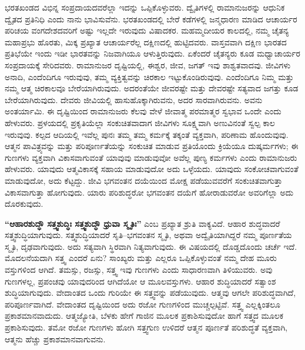 ಭರತಖಂಡದ ವಿಭಿನ್ನ ಸಂಪ್ರದಾಯದವರೆಲ್ಲಾ ಇದನ್ನು ಒಪ್ಪಿಕೊಳ್ಳುವರು. ದ್ವೈತಿಗಳಲ್ಲಿ ರಾಮಾನುಜರನ್ನು ಆಧುನಿಕ ದ್ವೈತದ ಪ್ರತಿನಿಧಿ ಎಂದು ನಾನು ಭಾವಿಸುವೆನು. ಭರತಖಂಡದಲ್ಲಿ ಬೇರೆ ಕಡೆಗಳಲ್ಲಿ ಜನ್ಮಧಾರಣ ಮಾಡಿದ ಆಚಾರ್ಯರ ಪರಿಚಯ ವಂಗದೇಶದವರಿಗೆ ಅಷ್ಟು ಇಲ್ಲದೇ ಇರುವುದು ವಿಷಾದಕರ. ಮಹಮ್ಮದೀಯರ ಕಾಲದಲ್ಲಿ, ನಮ್ಮ ಚೈತನ್ಯ ಮಹಾಪ್ರಭು ಹೊರತು, ಮಿಕ್ಕ ಪ್ರಖ್ಯಾತ ಆಚಾರ್ಯರೆಲ್ಲ ದಕ್ಷಿಣದಲ್ಲಿ ಹುಟ್ಟಿದವರು. ವಾಸ್ತವವಾಗಿ ದಕ್ಷಿಣ ಭಾರತದ ಪ್ರತಿಭೆಯೇ ಇಂದು ಇಡೀ ಭಾರತವನ್ನು ನಿಜವಾಗಿಯೂ ಆಳುತ್ತಿರುವುದು. ಏಕೆಂದರೆ ಚೈತನ್ಯರು ಕೂಡ ಮಧ್ವಾಚಾರ್ಯರ ಸಂಪ್ರದಾಯಕ್ಕೆ ಸೇರಿದವರು. ರಾಮಾನುಜರ ದೃಷ್ಟಿಯಲ್ಲಿ, ಈಶ್ವರ, ಜೀವ, ಜಗತ್​ ಇವು ಶಾಶ್ವತವಾದವು. ಜೀವಿಗಳು ಅನಾದಿ, ಎಂದೆಂದಿಗೂ ಇರುವುವು, ತಮ್ಮ ವ್ಯಕ್ತಿತ್ವವನ್ನು ಚಿರಕಾಲ ಇಟ್ಟುಕೊಂಡಿರುವುವು. ಎಂದೆಂದಿಗೂ ನಿಮ್ಮ ಮತ್ತು ನಮ್ಮ ಆತ್ಮ ಚಿರಕಾಲವೂ ಬೇರೆಯಾಗಿರುವುದು. ಅದರಂತೆಯೇ ಜೀವರಷ್ಟೇ ಮತ್ತು ದೇವರಷ್ಟೇ ಸತ್ಯವಾದ ಜಗತ್ತು ಕೂಡ ಬೇರೆಯಾಗಿರುವುದು. ದೇವರು ಜೀವಿಯಲ್ಲಿ ಹಾಸುಹೊಕ್ಕಾಗಿರುವನು, ಅದರ ಸಾರವಾಗಿರುವನು. ಅವನು ಅಂತರ್ಯಾಮಿ. ಈ ದೃಷ್ಟಿಯಿಂದ ರಾಮಾನುಜರು ಕೆಲವು ವೇಳೆ ಜೀವಾತ್ಮ ಪರಮಾತ್ಮರ ಸ್ವಭಾವ ಒಂದೇ ಎಂದು ಹೇಳುವರು. ಪ್ರಳಯದಲ್ಲಿ ಪ್ರಕೃತಿಯೆಲ್ಲಾ ಸಂಕುಚಿತವಾದಾಗ ಜೀವಿಗಳು ಸೂಕ್ಷ್ಮವಾಗಿ ಅಣುವಿನಂತೆ ಸ್ವಲ್ಪ ಕಾಲ ಇರುವುವು. ಕಲ್ಪದ ಆದಿಯಲ್ಲಿ ಇವೆಲ್ಲ ಪುನಃ ತಮ್ಮ ತಮ್ಮ ಕರ್ಮಕ್ಕೆ ತಕ್ಕಂತೆ ವ್ಯಕ್ತವಾಗಿ, ಪರಿಣಾಮ ಹೊಂದುವುವು. ಆತ್ಮನ ಪಾವಿತ್ರ್ಯವನ್ನು ಮತ್ತು ಪರಿಪೂರ್ಣತೆಯನ್ನು ಸಂಕುಚಿತ ಮಾಡುವ ಪ್ರತಿಯೊಂದು ಕ್ರಿಯೆಯೂ ದುಷ್ಕರ್ಮಗಳು; ಈ ಗುಣಗಳು ವ್ಯಕ್ತವಾಗಿ ವಿಕಾಸವಾಗುವಂತೆ ಯಾವುವು ಮಾಡುವುವೋ ಅವೆಲ್ಲ ಪುಣ್ಯ ಕರ್ಮಗಳು ಎಂದು ರಾಮಾನುಜರು ಹೇಳುವರು. ಯಾವುದು ಆತ್ಮವಿಕಾಸಕ್ಕೆ ಸಹಾಯ ಮಾಡುವುದೋ ಅದು ಒಳ್ಳೆಯದು. ಯಾವುದು ಸಂಕೋಚವಾಗುವಂತೆ ಮಾಡುವುದೋ, ಅದು ಕೆಟ್ಟದ್ದು. ಜೀವಿ ಭಗವಂತನ ದಯೆಯಿಂದ ಮೋಕ್ಷ ಪಡೆಯುವವರೆಗೆ ಸಂಕುಚಿತವಾಗುತ್ತಾ ವಿಕಾಸವಾಗುತ್ತಾ ಹೋಗುವುದು. ಯಾರು ಪರಿಶುದ್ಧರೋ ಭಗವಂತನ ದಯೆಗೆ ಹೋರಾಡುವರೋ ಅವರಿಗೆಲ್ಲಾ ಅದು ದೊರಕುವುದು.

\textbf{“ಆಹಾರಶುದ್ಧೌ ಸತ್ತ್ವಶುದ್ಧಿಃ ಸತ್ತ್ವಶುದ್ಧೌ ಧ್ರುವಾ ಸ್ಮೃತಿಃ”} ಎಂಬ ಪ್ರಖ್ಯಾತ ಶ್ರುತಿ ವಾಕ್ಯವಿದೆ. ಆಹಾರ ಶುದ್ಧವಾದರೆ ಸತ್ತ್ವಶುದ್ಧಿಯಾಗುವುದು. ಸತ್ತ್ವಶುದ್ಧಿಯಾದರೆ ಸೃತಿ–ಭಗವಂತನ ಸ್ಮೃತಿ, ಅಥವಾ ಅದ್ವೈತಿಯಾಗಿದ್ದರೆ ನಮ್ಮ ಪೂರ್ಣತೆಯ ಸ್ಮೃತಿ, ದೃಢವಾಗುವುದು. ಅದು ಸತ್ಯವಾಗಿ ಸ್ಥಿರವಾಗಿ ನಿತ್ಯವಾಗುವುದು. ಈ ವಿಷಯದಲ್ಲಿ ದೊಡ್ಡದೊಂದು ಚರ್ಚೆ ಇದೆ. ಮೊದಲನೆಯದಾಗಿ ಸತ್ತ್ವ ಎಂದರೆ ಏನು? ಸಾಂಖ್ಯರು ಮತ್ತು ಎಲ್ಲರೂ ಒಪ್ಪಿಕೊಳ್ಳುವಂತೆ ನಮ್ಮ ದೇಹ ಮೂರು ವಸ್ತುಗಳಿಂದ ಆಗಿದೆ. ತಮಸ್ಸು, ರಜಸ್ಸು, ಸತ್ತ್ವ ಇವು ಗುಣಗಳು ಎಂದು ಸಾಧಾರಣವಾಗಿ ತಿಳಿಯುವರು. ಅವು ಗುಣಗಳಲ್ಲ, ಪ್ರಪಂಚವು ಯಾವುದರಿಂದ ಆಗಿದೆಯೋ ಆ ಮೂಲವಸ್ತುಗಳು. ಆಹಾರ ಶುದ್ಧಿಯಾದರೆ ಸತ್ವಾಂಶ ಶುದ್ಧಿಯಾಗುವುದು. ವೇದಾಂತದ ಒಂದು ಗುರಿಯೇ ಈ ಸತ್ತ್ವವನ್ನು ಪಡೆಯುವುದು. ಆತ್ಮವು ಆಗಲೇ ಪರಿಶುದ್ಧವಾಗಿದೆ, ಪರಿಪೂರ್ಣವಾಗಿದೆ. ವೇದಾಂತದ ದೃಷ್ಟಿಯಿಂದ ಅದು ರಜೋ ಗುಣಗಳಿಂದ ಮುಚ್ಚಲ್ಪಟ್ಟಿವೆ. ಸತ್ತ್ವ ಎಲ್ಲಕ್ಕಿಂತಲೂ ಪ್ರಕಾಶಮಾನವಾದುದು. ಆತ್ಮಜ್ಯೋತಿ, ಬೆಳಕು ಹೇಗೆ ಗಾಜಿನ ಮೂಲಕ ಪ್ರಕಾಶಿಸುವುದೋ ಹಾಗೆ ಸತ್ತ್ವದ ಮೂಲಕ ಪ್ರಕಾಶಿಸುವುದು. ತಮೋ ರಜೋ ಗುಣಗಳು ಹೋಗಿ ಸತ್ತ್ವಗುಣ ಉಳಿದರೆ ಆತ್ಮನ ಪೂರ್ಣತೆ ಪರಿಶುದ್ಧತೆ ವ್ಯಕ್ತವಾಗಿ, ಆತ್ಮನು ಹೆಚ್ಚು ಪ್ರಕಾಶಮಾನವಾಗುವನು.

